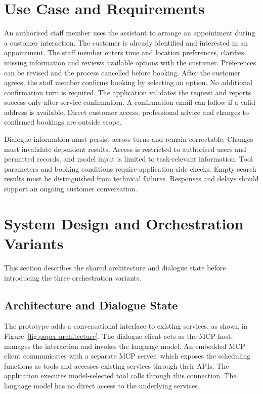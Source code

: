 \section{Use Case and Requirements}\label{sec:requirements}
An authorised staff member uses the assistant to arrange an appointment during a customer interaction.
The customer is already identified and interested in an appointment.
The staff member enters time and location preferences, clarifies missing information and reviews available options with the customer.
Preferences can be revised and the process cancelled before booking.
After the customer agrees, the staff member confirms booking by selecting an option.
No additional confirmation turn is required.
The application validates the request and reports success only after service confirmation.
A confirmation email can follow if a valid address is available.
Direct customer access, professional advice and changes to confirmed bookings are outside scope.

Dialogue information must persist across turns and remain correctable.
Changes must invalidate dependent results.
Access is restricted to authorised users and permitted records, and model input is limited to task-relevant information.
Tool parameters and booking conditions require application-side checks.
Empty search results must be distinguished from technical failures.
Responses and delays should support an ongoing customer conversation.

\section{System Design and Orchestration Variants}\label{Sec:MainPart}
This section describes the shared architecture and dialogue state before introducing the three orchestration variants.

\subsection{Architecture and Dialogue State}
The prototype adds a conversational interface to existing services, as shown in Figure~\ref{fig:paper-architecture}.
The dialogue client acts as the MCP host, manages the interaction and invokes the language model.
An embedded MCP client communicates with a separate MCP server, which exposes the scheduling functions as tools and accesses existing services through their APIs.
The application executes model-selected tool calls through this connection.
The language model has no direct access to the underlying services.

